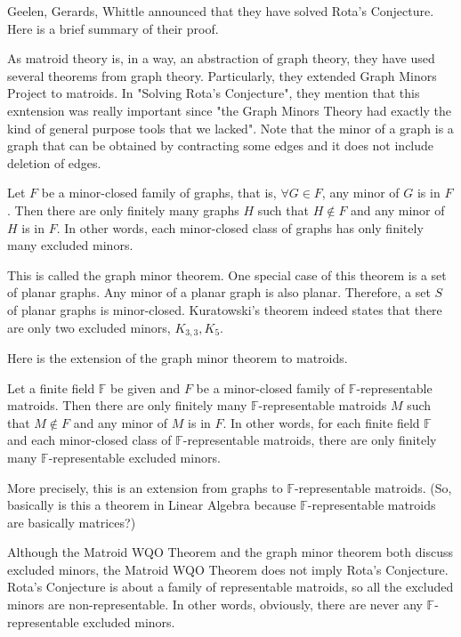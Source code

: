 Geelen, Gerards, Whittle announced that they have solved Rota's Conjecture.
Here is a brief summary of their proof.

As matroid theory is, in a way, an abstraction of graph theory, they have used several theorems from graph theory.
Particularly, they extended Graph Minors Project to matroids.
In "Solving Rota's Conjecture", they mention that this exntension was really important since "the Graph Minors Theory had exactly the kind of general purpose tools that we lacked".
Note that the minor of a graph is a graph that can be obtained by contracting some edges and it does not include deletion of edges.

\begin{thm}
Let $F$ be a minor-closed family of graphs, that is, $\forall G \in F$, any minor of $G$ is in $F$.
Then there are only finitely many graphs $H$ such that $H \notin F$ and any minor of $H$ is in $F$.
In other words, each minor-closed class of graphs has only finitely many excluded minors.
\end{thm}

This is called the graph minor theorem.
One special case of this theorem is a set of planar graphs.
Any minor of a planar graph is also planar.
Therefore, a set $S$ of planar graphs is minor-closed.
Kuratowski's theorem indeed states that there are only two excluded minors, $K_{3, 3}, K_5$.

Here is the extension of the graph minor theorem to matroids.

\begin{thm} 
Let a finite field $\mathbb{F}$ be given and $F$ be a minor-closed family of $\mathbb{F}$-representable matroids.
Then there are only finitely many $\mathbb{F}$-representable matroids $M$ such that $M \notin F$ and any minor of $M$ is in $F$.
In other words, for each finite field $\mathbb{F}$ and each minor-closed class of $\mathbb{F}$-representable matroids, there are only finitely many $\mathbb{F}$-representable excluded minors.
\end{thm}

More precisely, this is an extension from graphs to $\mathbb{F}$-representable matroids.
(So, basically is this a theorem in Linear Algebra because $\mathbb{F}$-representable matroids are basically matrices?)

Although the Matroid WQO Theorem and the graph minor theorem both discuss excluded minors, the Matroid WQO Theorem does not imply Rota's Conjecture.
Rota's Conjecture is about a family of representable matroids, so all the excluded minors are non-representable.
In other words, obviously, there are never any $\mathbb{F}$-representable excluded minors.


